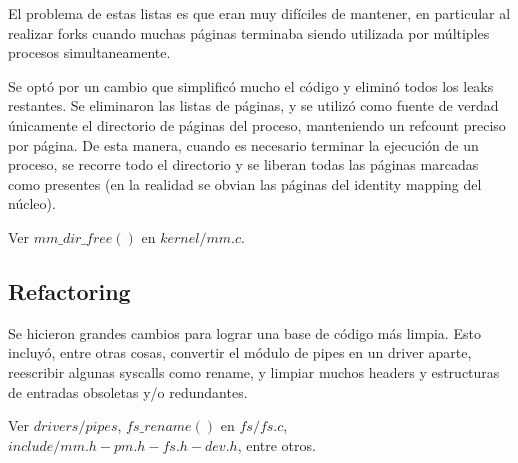 El problema de estas listas es que eran muy difíciles de mantener, en particular
al realizar forks cuando muchas páginas terminaba siendo utilizada por múltiples
procesos simultaneamente.

Se optó por un cambio que simplificó mucho el código y eliminó todos los leaks
restantes. Se eliminaron las listas de páginas, y se utilizó como fuente de
verdad únicamente el directorio de páginas del proceso, manteniendo un refcount
preciso por página. De esta manera, cuando es necesario terminar la ejecución de
un proceso, se recorre todo el directorio y se liberan todas las páginas marcadas
como presentes (en la realidad se obvian las páginas del identity mapping del
núcleo).

Ver $mm\_dir\_free()$ en $kernel/mm.c$.

\subsection{Refactoring}

Se hicieron grandes cambios para lograr una base de código más limpia. Esto
incluyó, entre otras cosas, convertir el módulo de pipes en un driver aparte,
reescribir algunas syscalls como rename, y limpiar muchos headers y
estructuras de entradas obsoletas y/o redundantes.

Ver $drivers/pipes$, $fs\_rename()$ en $fs/fs.c$, $include/mm.h-pm.h-fs.h-dev.h$,
entre otros.
